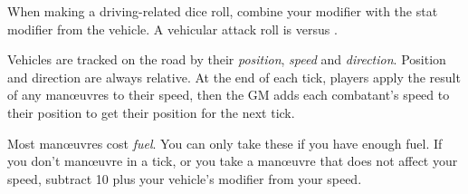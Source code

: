
When making a driving-related dice roll, combine your  modifier with the stat modifier from the vehicle. A vehicular attack roll is  versus .

Vehicles are tracked on the road by their \emph{position}, \emph{speed} and \emph{direction}. Position and direction are always relative. At the end of each tick, players apply the result of any man\oe{}uvres to their speed, then the GM adds each combatant's speed to their position to get their position for the next tick.

Most man\oe{}uvres cost \emph{fuel}. You can only take these if you have enough fuel. If you don't man\oe{}uvre in a tick, or you take a man\oe{}uvre that does not affect your speed, subtract 10 plus your vehicle's  modifier from your speed.
